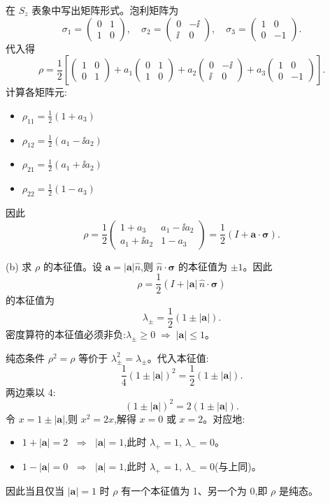 \begin{question}
\begin{solution}
在 $S_z$ 表象中写出矩阵形式。泡利矩阵为
\[
\sigma_1 = \begin{pmatrix}0&1\\1&0\end{pmatrix},\quad
\sigma_2 = \begin{pmatrix}0&-\ii\\\ii&0\end{pmatrix},\quad
\sigma_3 = \begin{pmatrix}1&0\\0&-1\end{pmatrix}.
\]
代入得
\[
\rho = \frac12\left[
\begin{pmatrix}1&0\\0&1\end{pmatrix}
+ a_1\begin{pmatrix}0&1\\1&0\end{pmatrix}
+ a_2\begin{pmatrix}0&-\ii\\\ii&0\end{pmatrix}
+ a_3\begin{pmatrix}1&0\\0&-1\end{pmatrix}
\right].
\]
计算各矩阵元:
\begin{itemize}
\item $\rho_{11} = \frac12(1 + a_3)$
\item $\rho_{12} = \frac12(a_1 - \ii a_2)$
\item $\rho_{21} = \frac12(a_1 + \ii a_2)$
\item $\rho_{22} = \frac12(1 - a_3)$
\end{itemize}
因此
\[
\boxed{\rho = \frac12\begin{pmatrix}
1+a_3 & a_1-\ii a_2\\
a_1+\ii a_2 & 1-a_3
\end{pmatrix}
= \frac12(I+\mathbf a\cdot\boldsymbol\sigma).}
\]

(b) 求 $\rho$ 的本征值。设 $\mathbf a = |\mathbf a|\hat n$,则 $\hat n\cdot\boldsymbol\sigma$ 的本征值为 $\pm 1$。因此
\[
\rho = \frac12(I + |\mathbf a|\,\hat n\cdot\boldsymbol\sigma)
\]
的本征值为
\[
\lambda_\pm = \frac12(1 \pm |\mathbf a|).
\]
密度算符的本征值必须非负:$\lambda_\pm \ge 0 \;\Longrightarrow\; |\mathbf a| \le 1$。

纯态条件 $\rho^2 = \rho$ 等价于 $\lambda_\pm^2 = \lambda_\pm$。代入本征值:
\[
\frac14(1\pm|\mathbf a|)^2 = \frac12(1\pm|\mathbf a|).
\]
两边乘以 4:
\[
(1\pm|\mathbf a|)^2 = 2(1\pm|\mathbf a|).
\]
令 $x = 1\pm|\mathbf a|$,则 $x^2 = 2x$,解得 $x=0$ 或 $x=2$。对应地:
\begin{itemize}
\item $1+|\mathbf a| = 2$ $\;\Longrightarrow\;$ $|\mathbf a| = 1$,此时 $\lambda_+ = 1$, $\lambda_- = 0$。
\item $1-|\mathbf a| = 0$ $\;\Longrightarrow\;$ $|\mathbf a| = 1$,此时 $\lambda_+ = 1$, $\lambda_- = 0$(与上同)。
\end{itemize}
因此当且仅当 $|\mathbf a| = 1$ 时 $\rho$ 有一个本征值为 1、另一个为 0,即 $\rho$ 是纯态。


\end{solution}
\end{question}
